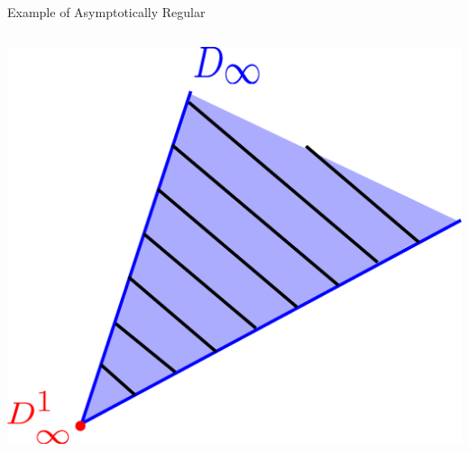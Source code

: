 \documentclass[aspectratio=169, dvipdfmx, 11pt]{beamer} %
\begin{document}
\begin{frame}{Example of Asymptotically Regular}
\begin{columns}
\begin{column}{0.48\textwidth}
        \includegraphics[keepaspectratio, scale=0.085]{figures/example_not_asymptotically_regular_2.eps}
        \end{column}
    \end{columns}
\end{frame}
\end{document}
